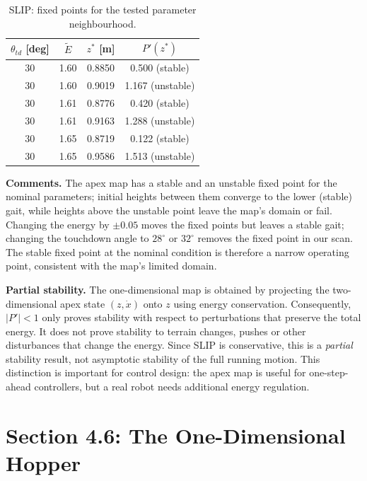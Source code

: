 \documentclass[11pt]{article}
\begin{document}
\begin{table}[H]
\centering
\caption{SLIP: fixed points for the tested parameter neighbourhood.}
\begin{tabular}{cccc}
\toprule
$\theta_{td}$ [deg] & $\tilde E$ & $z^*$ [m] & $P'(z^*)$ \\
\midrule
30 & 1.60 & 0.8850 & 0.500 (stable) \\
30 & 1.60 & 0.9019 & 1.167 (unstable) \\
30 & 1.61 & 0.8776 & 0.420 (stable) \\
30 & 1.61 & 0.9163 & 1.288 (unstable) \\
30 & 1.65 & 0.8719 & 0.122 (stable) \\
30 & 1.65 & 0.9586 & 1.513 (unstable) \\
\bottomrule
\end{tabular}
\end{table}

\textbf{Comments.}  The apex map has a stable and an unstable fixed point for
the nominal parameters; initial heights between them converge to the lower
(stable) gait, while heights above the unstable point leave the map's domain
or fail.  Changing the energy by $\pm0.05$ moves the fixed points but leaves a
stable gait; changing the touchdown angle to $28^\circ$ or $32^\circ$ removes
the fixed point in our scan.  The stable fixed point at the nominal condition
is therefore a narrow operating point, consistent with the map's limited
domain.

\textbf{Partial stability.}  The one-dimensional map is obtained by projecting
the two-dimensional apex state $(z,\dot x)$ onto $z$ using energy
conservation.  Consequently, $|P'|<1$ only proves stability with respect to
perturbations that preserve the total energy.  It does not prove stability to
terrain changes, pushes or other disturbances that change the energy.  Since
SLIP is conservative, this is a \emph{partial} stability result, not asymptotic
stability of the full running motion.  This distinction is important for
control design: the apex map is useful for one-step-ahead controllers, but a
real robot needs additional energy regulation.

\section{Section 4.6: The One-Dimensional Hopper}
\end{document}
